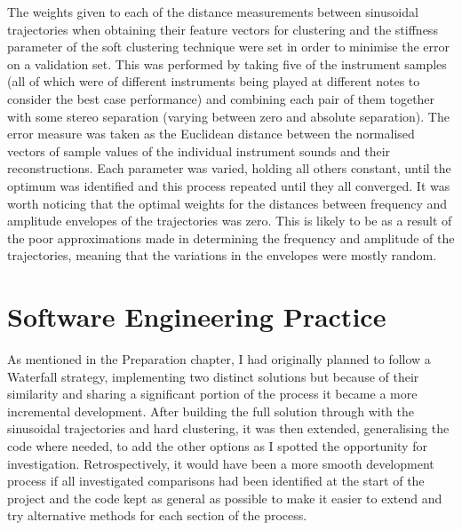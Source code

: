 \documentclass[10pt,twoside,a4paper]{report}
\begin{document}
The weights given to each of the distance measurements between sinusoidal trajectories when obtaining their feature vectors for clustering and the stiffness parameter of the soft clustering technique were set in order to minimise the error on a validation set. This was performed by taking five of the instrument samples (all of which were of different instruments being played at different notes to consider the best case performance) and combining each pair of them together with some stereo separation (varying between zero and absolute separation). The error measure was taken as the Euclidean distance between the normalised vectors of sample values of the individual instrument sounds and their reconstructions. Each parameter was varied, holding all others constant, until the optimum was identified and this process repeated until they all converged. It was worth noticing that the optimal weights for the distances between frequency and amplitude envelopes of the trajectories was zero. This is likely to be as a result of the poor approximations made in determining the frequency and amplitude of the trajectories, meaning that the variations in the envelopes were mostly random.




\section{Software Engineering Practice}

As mentioned in the Preparation chapter, I had originally planned to follow a Waterfall strategy, implementing two distinct solutions but because of their similarity and sharing a significant portion of the process it became a more incremental development. After building the full solution through with the sinusoidal trajectories and hard clustering, it was then extended, generalising the code where needed, to add the other options as I spotted the opportunity for investigation. Retrospectively, it would have been a more smooth development process if all investigated comparisons had been identified at the start of the project and the code kept as general as possible to make it easier to extend and try alternative methods for each section of the process.
\end{document}
